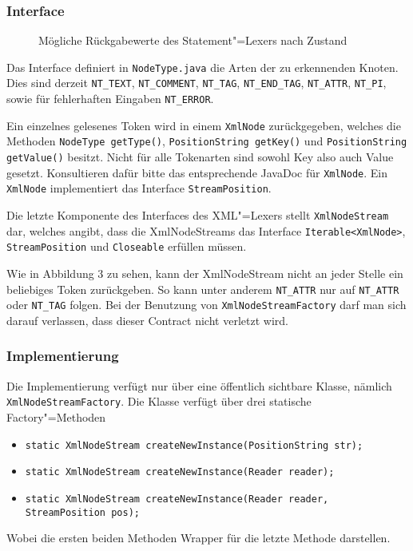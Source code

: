 \documentclass[10pt,a4paper,ngerman,titlepage,tocindentauto]{scrartcl}
\newcommand{\n}{\linebreak[1]}
\begin{document}
			\subsubsection*{Interface}
				\begin{wrapfigure}{R}{0.3\textwidth}
					\caption{Mög\-li\-che Rück\-ga\-be\-wer\-te des State\-ment"=Le\-xers nach Zu\-stand}
					\fbox{\centering
						\texttt{[image: graphiken/Ausgaben.pdf]}
					}
				\end{wrapfigure}
				
				Das Interface definiert in \texttt{NodeType.java} die Arten der zu erkennenden Knoten.
				Dies sind derzeit \texttt{NT\_TEXT}, \texttt{NT\_COMMENT}, \texttt{NT\_TAG}, \texttt{NT\_END\_TAG},
				\texttt{NT\_ATTR}, \texttt{NT\_PI}, sowie für fehlerhaften Eingaben \texttt{NT\_ERROR}.
				
				Ein einzelnes gelesenes Token wird in einem \texttt{XmlNode} zurückgegeben, welches die Methoden
				\texttt{NodeType getType()}, \texttt{PositionString getKey()} und \texttt{PositionString getValue()}
				besitzt. Nicht für alle Tokenarten sind sowohl Key also auch Value gesetzt. Konsultieren dafür
				bitte das entsprechende JavaDoc für \texttt{XmlNode}. Ein \texttt{XmlNode} implementiert das Interface
				\texttt{StreamPosition}.
				
				Die letzte Komponente des Interfaces des XML"=Lexers stellt \texttt{XmlNodeStream} dar, welches
				angibt, dass die XmlNodeStreams das Interface \texttt{Iterable<{\n}XmlNode>}, \texttt{StreamPosition} und
				\texttt{Closeable} erfüllen müssen.
				
				Wie in Abbildung 3 zu sehen, kann der XmlNodeStream nicht an jeder Stelle ein beliebiges Token zurückgeben.
				So kann unter anderem \texttt{NT\_ATTR} nur auf \texttt{NT\_ATTR} oder \texttt{NT\_TAG} folgen.
				Bei der Benutzung von \texttt{XmlNodeStreamFactory} darf man sich darauf verlassen, dass dieser Contract
				nicht verletzt wird.
			
			\subsubsection*{Implementierung}
				Die Implementierung verfügt nur über eine öffentlich sichtbare Klasse, nämlich \texttt{Xml\-Node\-Stream\-Factory}.
				Die Klasse verfügt über drei statische Factory"=Methoden
				\begin{itemize}
					\item \texttt{static XmlNodeStream createNewInstance(PositionString str);}
					\item \texttt{static XmlNodeStream createNewInstance(Reader reader);}
					\item \texttt{static XmlNodeStream createNewInstance(Reader reader, StreamPosition pos);}
				\end{itemize}
				Wobei die ersten beiden Methoden Wrapper für die letzte Methode darstellen.
	
\end{document}
